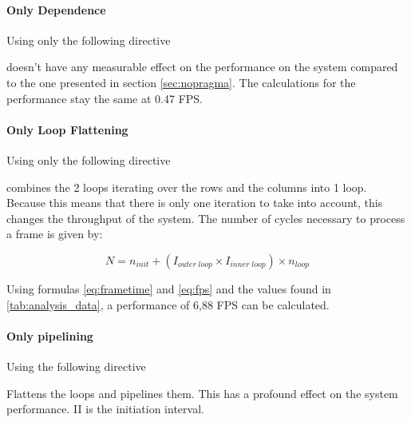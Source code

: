 \paragraph{Only Dependence}
Using only the following directive


doesn't have any measurable effect on the performance on the system compared to the one presented in section \ref{sec:nopragma}. The calculations for the performance stay the same at 0.47 FPS.

\paragraph{Only Loop Flattening}
Using only the following directive


combines the 2 loops iterating over the rows and the columns into 1 loop. Because this means that there is only one iteration to take into account, this changes the throughput of the system. The number of cycles necessary to process a frame is given by:


\begin{equation}
N = n_{init} + (I_{outer\;loop} \times I_{inner\;loop}) \times n_{loop}
\end{equation}

\bigskip

Using formulas \ref{eq:frametime} and \ref{eq:fps} and the values found in \ref{tab:analysis_data}, a performance of 6,88 FPS can be calculated. 

\paragraph{Only pipelining} Using the following directive


Flattens the loops and pipelines them. This has a profound effect on the system performance. II is the initiation interval.


